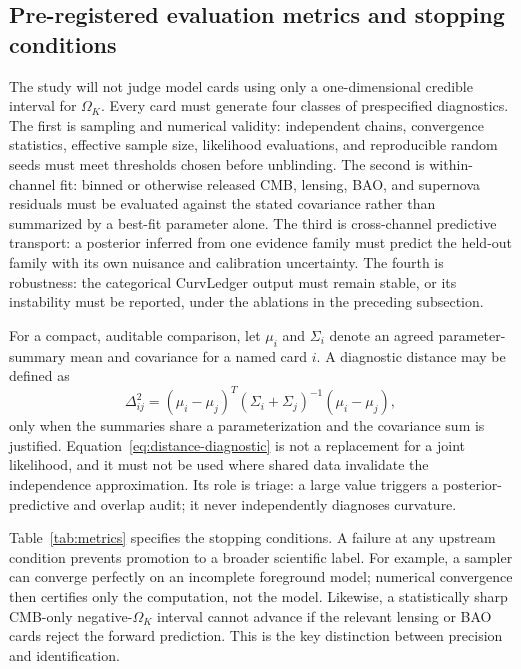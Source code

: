 \documentclass[conference]{IEEEtran}
\newcommand{\ok}{\ensuremath{\Omega_K}}
\begin{document}
\subsection{Pre-registered evaluation metrics and stopping conditions}

The study will not judge model cards using only a one-dimensional credible interval for $\ok$. Every card must generate four classes of prespecified diagnostics. The first is sampling and numerical validity: independent chains, convergence statistics, effective sample size, likelihood evaluations, and reproducible random seeds must meet thresholds chosen before unblinding. The second is within-channel fit: binned or otherwise released CMB, lensing, BAO, and supernova residuals must be evaluated against the stated covariance rather than summarized by a best-fit parameter alone. The third is cross-channel predictive transport: a posterior inferred from one evidence family must predict the held-out family with its own nuisance and calibration uncertainty. The fourth is robustness: the categorical CurvLedger output must remain stable, or its instability must be reported, under the ablations in the preceding subsection.

For a compact, auditable comparison, let $\mu_i$ and $\Sigma_i$ denote an agreed parameter-summary mean and covariance for a named card $i$. A diagnostic distance may be defined as
\begin{equation}
\Delta_{ij}^2=(\mu_i-\mu_j)^T(\Sigma_i+\Sigma_j)^{-1}(\mu_i-\mu_j),
\label{eq:distance-diagnostic}
\end{equation}
only when the summaries share a parameterization and the covariance sum is justified. Equation~\eqref{eq:distance-diagnostic} is not a replacement for a joint likelihood, and it must not be used where shared data invalidate the independence approximation. Its role is triage: a large value triggers a posterior-predictive and overlap audit; it never independently diagnoses curvature.

Table~\ref{tab:metrics} specifies the stopping conditions. A failure at any upstream condition prevents promotion to a broader scientific label. For example, a sampler can converge perfectly on an incomplete foreground model; numerical convergence then certifies only the computation, not the model. Likewise, a statistically sharp CMB-only negative-$\ok$ interval cannot advance if the relevant lensing or BAO cards reject the forward prediction. This is the key distinction between precision and identification.
\end{document}
